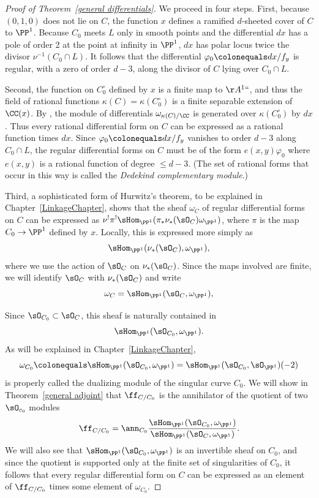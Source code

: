\begin{proof}[Proof of Theorem~\ref{general differentials}]
We proceed in four steps.
First, because  $(0,1,0)$ does not lie on $C$,
the function $x$ defines a
ramified $d$-sheeted cover of $C$ to $\PP^{1}$. Because $C_{0}$ meets $L$
only in smooth
points and the differential $dx$ has a pole of order 2 at the point at
infinity in $\PP^{1}$,
$dx$
has polar locus twice the divisor $ \nu^{-1}(C_{0}\cap L)$. It follows
that
the differential
$\varphi_0 \colonequals  dx/f_{y}$ is regular, with a zero of order $d-3$,
along the divisor of $C$ lying over $C_0\cap L$.

Second, the function on $C^\circ_0$ defined by $x$
is a finite map to $\AA^1` `$, and thus the field of rational functions
$\kappa(C) = \kappa(C^\circ_0)$ is a finite
separable extension of $\CC(x)$. By \cite[Section 16.5]{Eisenbud1995},
the module of differentials
$\omega_{\kappa(C)/\CC}$ is generated over $\kappa(C^\circ_0)$ by
$dx$. Thus every rational
differential form on $C$ can be expressed as a rational function
times $dx$. Since $\varphi_{0} \colonequals  dx/f_{y}$ vanishes to order
$d-3$ along $C_{0}\cap L$,
the regular differential forms on $C$ must be of the form
$e(x,y)\varphi_{0}$ where
$e(x,y)$ is a rational function of degree $\leq d-3$. (The set of rational
forms that occur in this
%
way is called the 
\emph{Dedekind complementary module}.)

Third,
a sophisticated form of Hurwitz's theorem, 
to be
explained in
Chapter~\ref{LinkageChapter},
shows that the sheaf $\omega_{C}$ of regular differential forms on $C$
can be expressed as $\nu^{!}\pi^{!}\sHom_{\PP^{1}}(\pi_{*}\nu_{*}(\sO_{C})
\omega_{\PP^{1}})$, where $\pi$ is the map $C_{0}\to \PP^{1}$ defined by $x$.
Locally, this is expressed more simply as
$$
\sHom_{\PP^{1}}(\nu_{*}(\sO_{C}), \omega_{\PP^{1}}),
$$
where we use the action of $\sO_{C}$ on $\nu_{*}(\sO_{C})$.
 Since the maps involved are finite,
we will  identify $\sO_{C}$  with $\nu_{*}(\sO_{C})$
 and write
$$
\omega_{C} = \sHom_{\PP^{1}}(\sO_{C}, \omega_{\PP^{1}}),
$$

Since $\sO_{C_{0}}\subset \sO_{C}$, this sheaf is naturally
contained
in
$$
 \sHom_{\PP^{1}}(\sO_{C_{0}}, \omega_{\PP^{1}}).
$$
As will be explained in Chapter~\ref{LinkageChapter},
$$
\omega_{C_{0}}\colonequals  \sHom_{\PP^{1}}(\sO_{C_{0}}, \omega_{\PP^{1}})
=
\sHom_{\PP^{1}}(\sO_{C_{0}}, \sO_{\PP^{1}})(-2)
$$
 is properly called the 
dualizing module
%
of the singular curve $C_{0}$.
We will show in Theorem~\ref{general adjoint} that
$\ff_{C/C_{0}} $ is the annihilator of the quotient of two $\sO_{c_{0}}$ modules
\vspace*{3pt}
$$
\vspace*{3pt}
\ff_{C/C_{0}} = \ann_{C_{0}}
\frac{\sHom_{\PP^{1}}(\sO_{C_{0}}, \omega_{\PP^{1}})}
{\sHom_{\PP^{1}}(\sO_{C}, \omega_{\PP^{1}})}.
$$
We will also see that $\sHom_{\PP^{1}}(\sO_{C_{0}}, \omega_{\PP^{1}})$
is an invertible sheaf on $C_{0}$, and since the quotient is supported only
at the finite set of singularities of $C_{0}$, it follows that every regular differential form on $C$ can be expressed as an
element of $\ff_{C/C_{0}} $
times some element of $\omega_{C_{0}}$.


\end{proof}
